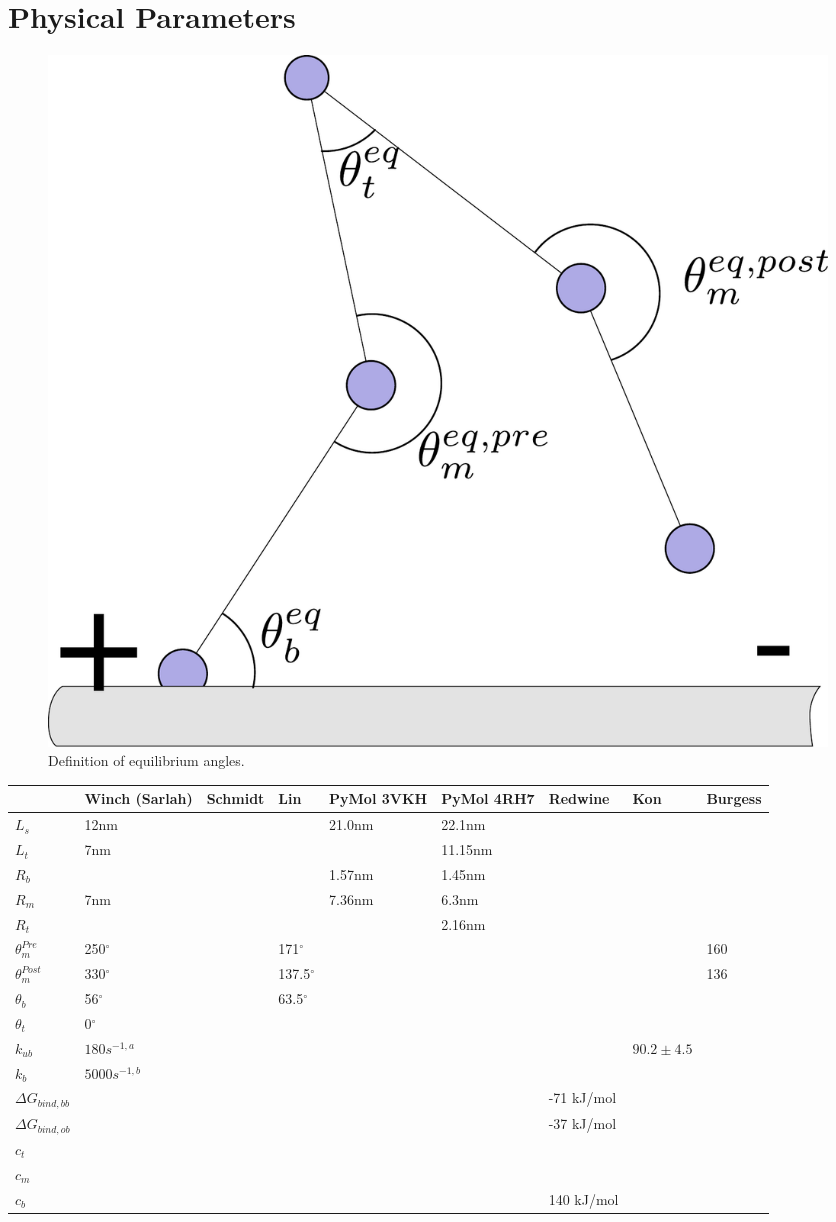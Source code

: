 \documentclass[10pt]{article} %
\begin{document}
\section{Physical Parameters}

\begin{figure}
  \centering
  \includegraphics[width=.45\textwidth]{../figures/equilibrium-onebound}
  \caption{Definition of equilibrium angles.}
  \label{fig:eq_angles}
\end{figure}

\begin{center}
  \begin{tabular}{| l | l | l | l | l | l | l | l | l |}
    \hline
    & Winch (Sarlah) & Schmidt & Lin & PyMol 3VKH & PyMol 4RH7 & Redwine & Kon & Burgess \\\hline
    $L_s$ & 12nm & & & 21.0nm & 22.1nm & & & \\ \hline
    $L_t$ &  7nm & & & & 11.15nm & & & \\ \hline
    $R_b$ &  & & & 1.57nm & 1.45nm & & & \\ \hline
    $R_m$ &  7nm & & & 7.36nm & 6.3nm & & & \\ \hline
    $R_t$ &  & & & & 2.16nm & & & \\ \hline
    $\theta_{m}^{Pre}$ & 250$^{\circ}$ & & 171$^{\circ}$ & & & & & 160\\ \hline
    $\theta_{m}^{Post}$ & 330$^{\circ}$ & & 137.5$^{\circ}$ & & & & & 136\\ \hline
    $\theta_{b}$ & 56$^{\circ}$ & & 63.5$^{\circ}$ & & & & & \\ \hline
    $\theta_{t}$ & 0$^{\circ}$ & & & & & & & \\ \hline
    $k_{ub}$ & $180 s^{-1,a}$ & & & & & & $90.2 \pm 4.5$& \\ \hline
    $k_b$ & $5000 s^{-1,b}$ & & & & & & & \\ \hline
    $\Delta G_{bind, bb}$ & & & & & & -71 kJ/mol & & \\ \hline
    $\Delta G_{bind, ob}$ & & & & & & -37 kJ/mol & & \\ \hline
    $c_t$ & & & & & & & & \\ \hline
    $c_m$ & & & & & & & & \\ \hline
    $c_b$ & & & & & & 140 kJ/mol & & \\ \hline
  \end{tabular}
\end{center}
\end{document}

